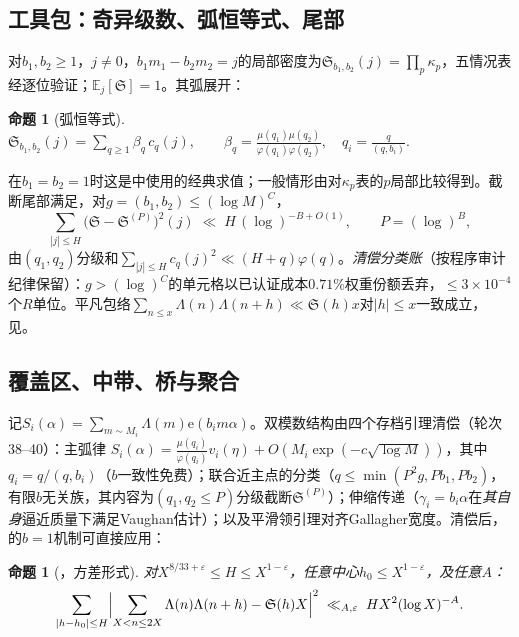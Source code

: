 \documentclass[11pt]{article}
\numberwithin{equation}{section}
\newtheorem{proposition}[theorem]{命题}
\theoremstyle{definition}
\theoremstyle{remark}
\newcommand{\LL}{\Lambda}
\newcommand{\SSS}{\mathfrak{S}}
\newcommand{\e}{\mathrm{e}}
\begin{document}
\subsection{工具包：奇异级数、弧恒等式、尾部}\label{s:fm:toolkit}

对$b_1,b_2\ge1$，$j\ne0$，$b_1m_1-b_2m_2=j$的局部密度为$\SSS_{b_1,b_2}(j)=\prod_p\kappa_p$，五情况表经逐位验证；$\mathbb E_j[\SSS]=1$。其弧展开：

\begin{proposition}[弧恒等式]\label{p:S}
$\displaystyle
\SSS_{b_1,b_2}(j)=\sum_{q\ge1}\beta_q\,c_q(j),\qquad
\beta_q=\frac{\mu(q_1)\mu(q_2)}{\varphi(q_1)\varphi(q_2)},\quad
q_i=\frac{q}{(q,b_i)}.$
\end{proposition}

\noindent 在$b_1=b_2=1$时这是\cite[(66)--(67)]{MRT}中使用的经典求值；一般情形由对$\kappa_p$表的$p$局部比较得到。截断尾部满足，对$g=(b_1,b_2)\le(\log M)^{C}$，
\begin{equation}\label{e:X2}
\textstyle\sum_{|j|\le H}\bigl(\SSS-\SSS^{(P)}\bigr)^2(j)\;\ll\;
H\,(\log)^{-B+O(1)},\qquad P=(\log)^{B},
\end{equation}
由$(q_1,q_2)$分级和$\sum_{|j|\le H}c_q(j)^2\ll(H+q)\varphi(q)$。\emph{清偿分类账}（按程序审计纪律保留）：$g>(\log)^{C}$的单元格以已认证成本$0.71\%$权重份额丢弃，$\le3\times10^{-4}$个$R$单位。平凡包络$\sum_{n\le x}\LL(n)\LL(n+h)\ll\SSS(h)x$对$|h|\le x$一致成立，见\cite[推论3.14]{HR}。

\subsection{覆盖区、中带、桥与聚合}\label{s:fm:R}

记$S_i(\alpha)=\sum_{m\sim M_i}\LL(m)\e(b_im\alpha)$。双模数结构由四个存档引理清偿（轮次38--40）：主弧律
$S_i(\alpha)=\frac{\mu(q_i)}{\varphi(q_i)}v_i(\eta)
+O(M_i\exp(-c\sqrt{\log M}))$，其中$q_i=q/(q,b_i)$（$b$一致性免费）；联合近主点的分类（$q\le\min(P^2g,Pb_1,Pb_2)$，有限$b$无关族，其内容为$(q_1,q_2\le P)$分级截断$\SSS^{(P)}$）；伸缩传递（$\gamma_i=b_i\alpha$在\emph{其自身}逼近质量下满足Vaughan估计）；以及平滑领引理对齐Gallagher宽度。清偿后，\cite{MRT}的$b=1$机制可直接应用：

\begin{proposition}[{\cite[定理1.3(i)]{MRT}}，方差形式]\label{p:IM}
对$X^{8/33+\varepsilon}\le H\le X^{1-\varepsilon}$，任意中心$h_0\le X^{1-\varepsilon}$，及任意$A$：
\[
\sum_{|h-h_0|\le H}\Bigl|\sum_{X<n\le2X}\LL(n)\LL(n+h)-\SSS(h)X
\Bigr|^2\;\ll_{A,\varepsilon}\;HX^2(\log X)^{-A}.
\]
\end{proposition}
\end{document}
